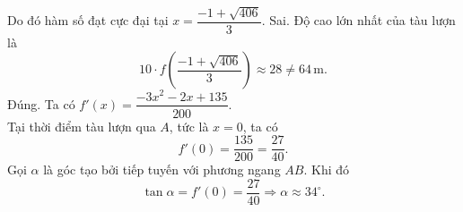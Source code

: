 \begin{ex}
{\begin{itemchoice}
\begin{center}
		\end{center}			
			Do đó hàm số đạt cực đại tại
			$
			x=\dfrac{-1+\sqrt{406}}{3}.
			$			
			\itemch Sai.			
			Độ cao lớn nhất của tàu lượn là
			\[
			10\cdot f\left(\dfrac{-1+\sqrt{406}}{3}\right)
			\approx28\ne 64\,\text{m}.
			\]			
			\itemch Đúng.			
			Ta có $f'(x)=\dfrac{-3x^2-2x+135}{200}$.\\			
			Tại thời điểm tàu lượn qua $A$, tức là $x=0$, ta có
			\[
			f'(0)=\dfrac{135}{200}=\dfrac{27}{40}.
			\]
			Gọi $\alpha$ là góc tạo bởi tiếp tuyến với phương ngang $AB$. Khi đó
			\[
			\tan\alpha=f'(0)=\dfrac{27}{40}\Rightarrow \alpha\approx34^\circ.
			\]
		\end{itemchoice}
	}
\end{ex}

